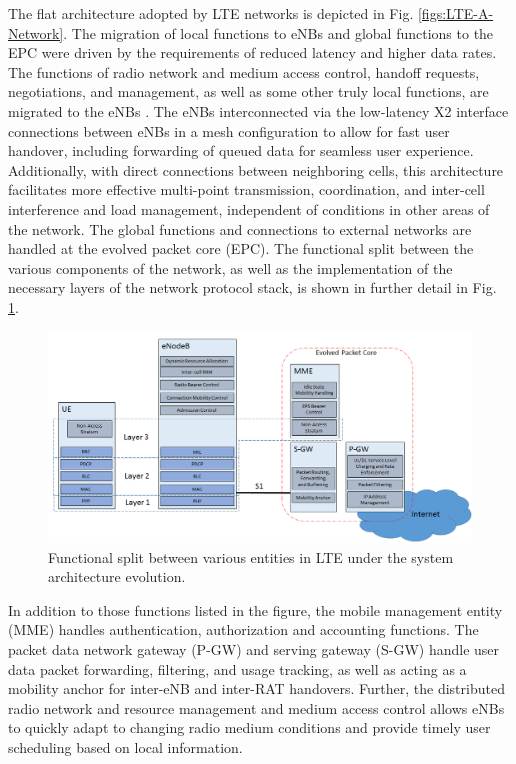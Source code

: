 The flat architecture adopted by LTE networks is depicted in Fig. \ref{figs:LTE-A-Network}.  The migration of local functions to eNBs and global functions to the EPC were driven by the requirements of reduced latency and higher data rates. The functions of radio network and medium access control, handoff requests, negotiations, and management, as well as some other truly local functions, are migrated to the eNBs \cite{tr36300}. The eNBs interconnected via the low-latency X2 interface connections between eNBs in a mesh configuration to allow for fast user handover, including forwarding of queued data for seamless user experience.  Additionally, with direct connections between neighboring cells, this architecture facilitates more effective multi-point transmission, coordination, and inter-cell interference and load management, independent of conditions in other areas of the network. The global functions and connections to external networks are handled at the evolved packet core (EPC). The functional split between the various components of the network, as well as the implementation of the necessary layers of the network protocol stack, is shown in further detail in Fig. \ref{figs:funcSplit}.
\begin{figure}[!ht]
	\centering
	\includegraphics[width=\textwidth]{figures3/LTE-decomp}
	\caption{Functional split between various entities in LTE under the system architecture evolution.}
	\label{figs:funcSplit}
\end{figure}
In addition to those functions listed in the figure, the mobile management entity (MME) handles authentication, authorization and accounting functions.  The packet data network gateway (P-GW) and serving gateway (S-GW) handle user data packet forwarding, filtering, and usage tracking, as well as acting as a mobility anchor for inter-eNB and inter-RAT handovers.  Further, the distributed radio network and resource management and medium access control allows eNBs to quickly adapt to changing radio medium conditions and provide timely user scheduling based on local information.

